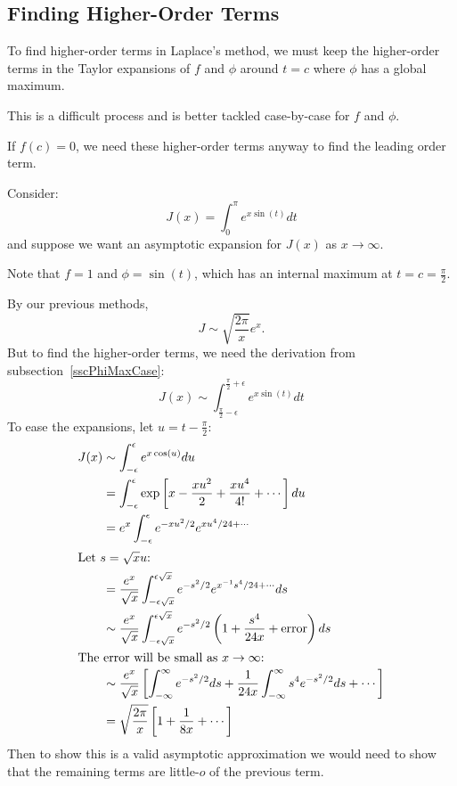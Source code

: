 \documentclass[../Main.tex]{subfiles}
\begin{document}
\subsection{Finding Higher-Order Terms}
To find higher-order terms in Laplace's method, we must keep the higher-order terms in the Taylor expansions of $f$ and $\phi$ around $t = c$ where $\phi$ has a global maximum.

\begin{remarks}
    \item This is a difficult process and is better tackled case-by-case for $f$ and $\phi$.
    \item If $f(c) = 0$, we need these higher-order terms anyway to find the leading order term.
\end{remarks}
\begin{example}
    Consider:
    \begin{equation*}
        J(x) = \int_{0}^{\pi} e^{x\sin(t)} dt 
    \end{equation*}
    and suppose we want an asymptotic expansion for $J(x)$ as $x \to \infty$.

    Note that $f = 1$ and $\phi = \sin(t)$, which has an internal maximum at $t = c = \frac\pi2$.

    By our previous methods,
    \begin{equation*}
        J \sim \sqrt{\frac{2\pi}{x}} e^x.
    \end{equation*}
    But to find the higher-order terms, we need the derivation from subsection~\ref{sscPhiMaxCase}:
    \begin{equation*}
        J(x) \sim \int_{\frac\pi2 - \epsilon}^{\frac\pi2 + \epsilon} e^{x\sin(t)} dt 
    \end{equation*}
    To ease the expansions, let $u = t - \frac\pi2$:
    \begin{align*}
        J(x) &\sim \int_{-\epsilon}^\epsilon e^{x\cos(u)}du \\
        &= \int_{-\epsilon}^{\epsilon} \exp\left[x - \frac{xu^2}{2} + \frac{xu^4}{4!} + \cdots\right] du \\
        &= e^x\int_{-\epsilon}^{\epsilon} e^{-xu^2 / 2} e^{xu^4 / 24 + \cdots} \\
        \intertext{Let $s = \sqrt{x} u$:}
        &= \frac{e^x}{\sqrt{x}} \int_{-\epsilon \sqrt{x}}^{\epsilon \sqrt{x}} e^{-s^2 / 2} e^{x^{-1} s^4 / 24 + \cdots} ds \\
        &\sim \frac{e^x}{\sqrt{x}} \int_{-\epsilon \sqrt{x}}^{\epsilon \sqrt{x}} e^{-s^2 / 2} \left(1 + \frac{s^4}{24x} + \text{error}\right) ds \\
        \intertext{The error will be small as $x\to\infty$:}
        &\sim \frac{e^x}{\sqrt{x}} \left[\int_{-\infty}^{\infty} e^{-s^2 / 2} ds + \frac1{24x} \int_{-\infty}^{\infty} s^4 e^{-s^2 / 2} ds + \cdots\right] \\
        &= \sqrt{\frac{2\pi}{x}} \left[1 + \frac{1}{8x} + \cdots\right]
    \end{align*}
    Then to show this is a valid asymptotic approximation we would need to show that the remaining terms are little-$o$ of the previous term.
\end{example}
\end{document}
